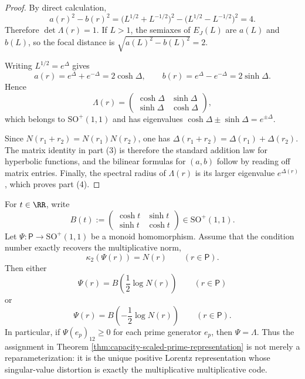 \begin{proof}
By direct calculation,
\[
a(r)^2-b(r)^2
=\bigl(L^{1/2}+L^{-1/2}\bigr)^2-\bigl(L^{1/2}-L^{-1/2}\bigr)^2
=4.
\]
Therefore \(\det\Lambda(r)=1\). If \(L>1\), the semiaxes of \(E_J(L)\) are \(a(L)\) and \(b(L)\), so the focal distance is \(\sqrt{a(L)^2-b(L)^2}=2\).

Writing \(L^{1/2}=e^\Delta\) gives
\[
a(r)=e^\Delta+e^{-\Delta}=2\cosh\Delta,
\qquad
b(r)=e^\Delta-e^{-\Delta}=2\sinh\Delta.
\]
Hence
\[
\Lambda(r)=
\begin{pmatrix}
\cosh\Delta & \sinh\Delta\\
\sinh\Delta & \cosh\Delta
\end{pmatrix},
\]
which belongs to \(\mathrm{SO}^+(1,1)\) and has eigenvalues \(\cosh\Delta\pm\sinh\Delta=e^{\pm\Delta}\).

Since \(N(r_1+r_2)=N(r_1)N(r_2)\), one has \(\Delta(r_1+r_2)=\Delta(r_1)+\Delta(r_2)\). The matrix identity in part (3) is therefore the standard addition law for hyperbolic functions, and the bilinear formulas for \((a,b)\) follow by reading off matrix entries. Finally, the spectral radius of \(\Lambda(r)\) is its larger eigenvalue \(e^{\Delta(r)}\), which proves part (4).
\end{proof}

\begin{theorem}\label{thm:capacity-scaled-lorentz-rigidity}
For \(t\in\RR\), write
\[
B(t):=
\begin{pmatrix}
\cosh t&\sinh t\\
\sinh t&\cosh t
\end{pmatrix}
\in\mathrm{SO}^+(1,1).
\]
Let \(\Psi:\mathsf P\to\mathrm{SO}^+(1,1)\) be a monoid homomorphism. Assume that the condition number exactly recovers the multiplicative norm,
\[
\kappa_2(\Psi(r))=N(r)\qquad(r\in\mathsf P).
\]
Then either
\[
\Psi(r)=B\!\left(\frac12\log N(r)\right)\qquad(r\in\mathsf P)
\]
or
\[
\Psi(r)=B\!\left(-\frac12\log N(r)\right)\qquad(r\in\mathsf P).
\]
In particular, if \(\Psi(e_p)_{12}\ge 0\) for each prime generator \(e_p\), then \(\Psi=\Lambda\). Thus the assignment in Theorem \ref{thm:capacity-scaled-prime-representation} is not merely a reparameterization: it is the unique positive Lorentz representation whose singular-value distortion is exactly the multiplicative multiplicative code.
\end{theorem}

